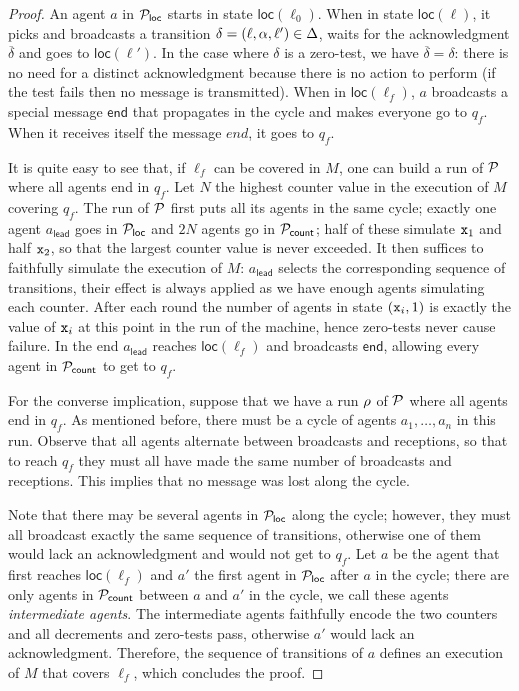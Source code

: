 \begin{proof}
	An agent $a$ in $\mathcal{P}_{\mathsf{loc}}$ starts in state $\mathsf{loc}(\ell_0)$. When in state $\mathsf{loc}(\ell)$, it picks and broadcasts a transition $\delta = (\ell, \alpha, \ell') \in \Delta$, waits for the acknowledgment $\overline{\delta}$ and goes to $\mathsf{loc}(\ell')$. In the case where $\delta$ is a zero-test, we have $\overline{\delta} = \delta$: there is no need for a distinct acknowledgment because there is no action to perform (if the test fails then no message is transmitted). When in $\mathsf{loc}(\ell_f)$, $a$ broadcasts a special message $\mathsf{end}$ that propagates in the cycle and makes everyone go to $q_f$. When it receives itself the message $end$, it goes to $q_f$. 
	
	It is quite easy to see that, if $\ell_f$ can be covered in $M$, one can build a run of $\mathcal{P}$ where all agents end in $q_f$. Let $N$ the highest counter value in the execution of $M$ covering $q_f$. The run of $\mathcal{P}$ first puts all its agents in the same cycle; exactly one agent $a_\mathsf{lead}$ goes in $\mathcal{P}_{\mathsf{loc}}$ and $2N$ agents go in $\mathcal{P}_{\mathsf{count}}$; half of these simulate $\mathtt{x}_1$ and half $\mathtt{x}_2$, so that the largest counter value is never exceeded. It then suffices to faithfully simulate the execution of $M$: $a_\mathsf{lead}$ selects the corresponding sequence of transitions, their effect is always applied as we have enough agents simulating each counter. After each round the number of agents in state $(\mathtt{x}_i,1)$ is exactly the value of $\mathtt{x}_i$ at this point in the run of the machine, hence zero-tests never cause failure. In the end $a_\mathsf{lead}$ reaches $\mathsf{loc}(\ell_f)$ and broadcasts $\mathsf{end}$, allowing every agent in $\mathcal{P}_{\mathsf{count}}$ to get to $q_f$.

	For the converse implication, suppose that we have a run $\rho$ of $\mathcal{P}$ where all agents end in $q_f$. As mentioned before, there must be a cycle of agents $a_1, \dots, a_n$ in this run. Observe that all agents alternate between broadcasts and receptions, so that to reach $q_f$ they must all have made the same number of broadcasts and receptions. This implies that no message was lost along the cycle.
	
	Note that there may be several agents in $\mathcal{P}_{\mathsf{loc}}$ along the cycle; however, they must all broadcast exactly the same sequence of transitions, otherwise one of them would lack an acknowledgment and would not get to $q_f$. Let $a$ be the agent that first reaches $\mathsf{loc}(\ell_f)$ and $a'$ the first agent in $\mathcal{P}_{\mathsf{loc}}$ after $a$ in the cycle; there are only agents in $\mathcal{P}_{\mathsf{count}}$ between $a$ and $a'$ in the cycle, we call these agents \emph{intermediate agents}. The intermediate agents faithfully encode the two counters and all decrements and zero-tests pass, otherwise $a'$ would lack an acknowledgment. Therefore, the sequence of transitions of $a$ defines an execution of $M$ that covers $\ell_f$, which concludes the proof.  
\end{proof}